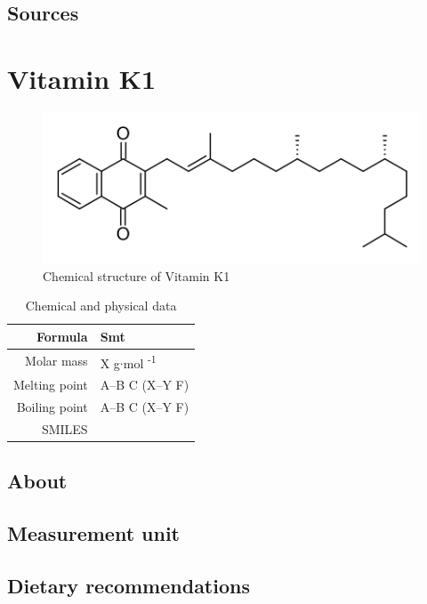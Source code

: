 \documentclass{book}
\begin{document}
\section{Sources}


\chapter{Vitamin K1}
\begin{figure}[h]
	\caption{Chemical structure of Vitamin K1}
	\centering \includegraphics[width=\textwidth]{images/Vitamin_K1_chemical_structure}
\end{figure}

\begin{table}[h]
	\caption{Chemical and physical data}
	\centering \begin{tabular}{| r | l |}
		\hline
		Formula & Smt\\ \hline
		Molar mass & X g$\cdot$mol \textsuperscript{-1}\\ \hline
		Melting point & A--B \degree C (X--Y \degree F)\\ \hline
		Boiling point & A--B \degree C (X--Y \degree F)\\ \hline
		SMILES & \\ \hline
	\end{tabular}
\end{table}
\newpage

\section{About}


\section{Measurement unit}


\section{Dietary recommendations}
\end{document}
